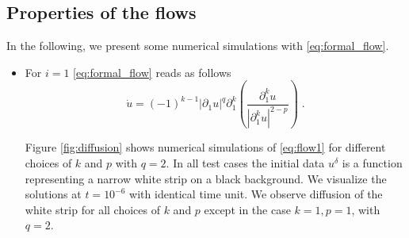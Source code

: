 \documentclass[runningheads,a4paper]{llncs}\usepackage{latexsym}
\newcommand{\ud}{u^\delta}
\newcommand{\abs}[1]{\left| #1 \right|}
\begin{document}
\subsection{Properties of the flows}
In the following, we present some numerical simulations with \eqref{eq:formal_flow}.
\begin{itemize}
 \item For $i=1$ \eqref{eq:formal_flow} reads as follows
\begin{equation} \label{eq:flow1}
 \dot{u} = (-1)^{k-1}\abs{\partial_1 u}^q \partial_1^k \left(\frac{\partial_1^k u}{\abs{\partial_1^k u}^{2-p}} \right)\;.
\end{equation}

Figure \ref{fig:diffusion} shows numerical simulations of \eqref{eq:flow1} for different choices of $k$ and $p$ with $q=2$. 
In all test cases the initial data $\ud$ is a function representing a narrow white strip on a black background.
We visualize the solutions at $t=10^{-6}$ with identical time unit. 
We observe diffusion of the white strip for all choices 
of $k$ and $p$ except in the case $k=1, p=1$, with $q=2$.


\end{itemize}
\end{document}
